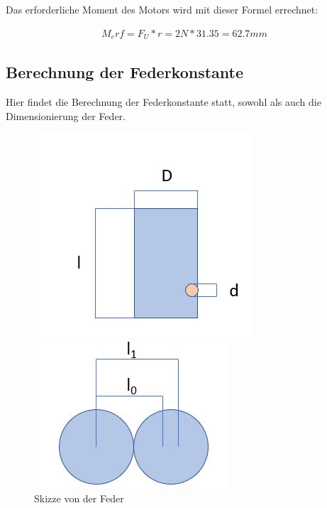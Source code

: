 Das erforderliche Moment des Motors wird mit dieser Formel errechnet:

\begin{align*}
M_erf=F_U*r=2N*31.35=62.7mm
\end{align*}
\newpage
\subsection{Berechnung der Federkonstante}

Hier findet die Berechnung der Federkonstante statt, sowohl als auch die Dimensionierung der Feder.

\begin{figure}[H]
   \begin{minipage}[hbt]{.4\linewidth} %
      \includegraphics[width=\linewidth]{Bilder/Powerpoint/Feder}
      \caption{Skizze von der Feder}
      \label{SkizzeFeder} 
   \end{minipage}
   \hspace{.1\linewidth}%
   \begin{minipage}[hbt]{.4\linewidth} %
      \includegraphics[width=\linewidth]{Bilder/Powerpoint/Federkonstante}

\end{minipage}
\end{figure}
